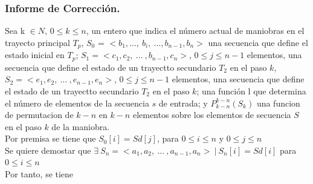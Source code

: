 \documentclass[12pt, a4paper]{article}
\begin{document}
\subsubsection{Informe de Corrección.}
Sea k $\in N$, $ 0 \leq k \leq n$, un entero que indica el número actual de maniobras en el trayecto principal $T_p$,
$S_0$ = $<b_1, \ldots,~b_i,~\ldots, b_{n-1}, b_n>$ una secuencia que define el estado inicial en $T_p$;
$S_1 = < c_1, c_2,~\ldots~, b_{n-1}, c_n >$, $ 0 \leq j \leq n - 1$ elementos, una secuencia que define el estado de un trayectto secundario $T_2$ en el paso $k$,
$S_2 =  < e_1, e_2,~\ldots~, e_{n-1}, e_n >$, $ 0 \leq j \leq n - 1$ elementos, una secuencia que define el estado de un trayectto secundario $T_2$ en el paso $k$;
una función l que determina el número de elementos de la secuencia $s$ de entrada;
y $P_{k-n}^{k-n}(S_k)$ una funcion de permutacion de $k-n$ en $k-n$ elementos sobre los elementos de secuencia
$S$ en el paso $k$ de la maniobra. \\
Por premisa se tiene que $S_0[i] = Sd[j]$,  para $0 \leq i \leq n$ y $0 \leq j \leq n$ \\
Se quiere demostar que $\exists~ S_n = < a_1, a_2, ~\ldots~, a_{n-1}, a_n >~|~S_n[i] = Sd[i]$ para $0 \leq i \leq n$\\

 Por tanto, se tiene \\
\end{document}
